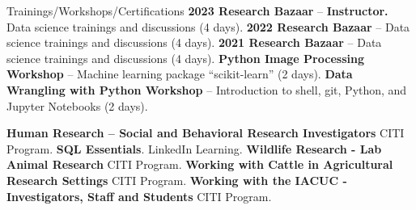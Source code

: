 \begin{rubric}{Trainings/Workshops/Certifications}
\entry*[4/2023] \textbf{2023 Research Bazaar} -- \textbf{Instructor.} Data science trainings and discussions (4 days).
\entry*[5/2022] \textbf{2022 Research Bazaar} -- Data science trainings and discussions (4 days).
\entry*[5/2021] \textbf{2021 Research Bazaar} -- Data science trainings and discussions (4 days).
\entry*[2/2020] \textbf{Python Image Processing Workshop} -- Machine learning package “scikit-learn” (2 days).
\entry*[2/2020] \textbf{Data Wrangling with Python Workshop} -- Introduction to shell, git, Python, and Jupyter Notebooks (2 days).

    \entry*[\emph{1/2024}]\textbf{Human Research -- Social and Behavioral Research Investigators} CITI Program. \href{https://github.com/amantaya/CV/blob/286493221d9eb7487b94547a68eb25f92f690e93/certifications/citi-Completion-Certificate_Human-Research_Social-Behavioral-Research-Inverstigators_Basic-Course.pdf}{\scriptsize\faLink}
    \entry*[7/2023] \textbf{SQL Essentials}. LinkedIn Learning. \href{https://github.com/amantaya/CV/blob/12c3c7c23746322f63703f2b4a97c45ef51b4da6/certifications/Certificate-Of-Completion-SQL-Essential-Training.pdf}{\scriptsize\faLink}
    \entry*[7/2021]\textbf{Wildlife Research - Lab Animal Research} CITI Program. \href{https://github.com/amantaya/CV/blob/286493221d9eb7487b94547a68eb25f92f690e93/certifications/citi-Completion-Certificate_Wildlife-Research_Wildlife-Research_Lab-Animal-Research.pdf}{\scriptsize\faLink}
    \entry*[7/2021]\textbf{Working with Cattle in Agricultural Research Settings} CITI Program. \href{https://github.com/amantaya/CV/blob/286493221d9eb7487b94547a68eb25f92f690e93/certifications/citi-Completion-Certificate_Working-with-Cattle-in-Agricultural-Research-Settings_Basic-Course.pdf}{\scriptsize\faLink}
    \entry*[7/2021]\textbf{Working with the IACUC - Investigators, Staff and Students} CITI Program. \href{https://github.com/amantaya/CV/blob/286493221d9eb7487b94547a68eb25f92f690e93/certifications/citi-Completion-Certificate_Working-with-the-IACUC_Working-with-the-IACUC-Investigators-Staff-Students_Basic-Course.pdf}{\scriptsize\faLink}

\end{rubric}

